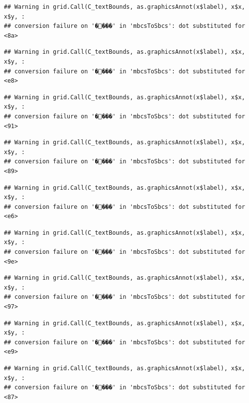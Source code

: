 \documentclass[
]{article}
\begin{document}
\begin{verbatim}
## Warning in grid.Call(C_textBounds, as.graphicsAnnot(x$label), x$x, x$y, :
## conversion failure on '����' in 'mbcsToSbcs': dot substituted for <8a>
\end{verbatim}

\begin{verbatim}
## Warning in grid.Call(C_textBounds, as.graphicsAnnot(x$label), x$x, x$y, :
## conversion failure on '����' in 'mbcsToSbcs': dot substituted for <e8>
\end{verbatim}

\begin{verbatim}
## Warning in grid.Call(C_textBounds, as.graphicsAnnot(x$label), x$x, x$y, :
## conversion failure on '����' in 'mbcsToSbcs': dot substituted for <91>
\end{verbatim}

\begin{verbatim}
## Warning in grid.Call(C_textBounds, as.graphicsAnnot(x$label), x$x, x$y, :
## conversion failure on '����' in 'mbcsToSbcs': dot substituted for <89>
\end{verbatim}

\begin{verbatim}
## Warning in grid.Call(C_textBounds, as.graphicsAnnot(x$label), x$x, x$y, :
## conversion failure on '����' in 'mbcsToSbcs': dot substituted for <e6>
\end{verbatim}

\begin{verbatim}
## Warning in grid.Call(C_textBounds, as.graphicsAnnot(x$label), x$x, x$y, :
## conversion failure on '����' in 'mbcsToSbcs': dot substituted for <9e>
\end{verbatim}

\begin{verbatim}
## Warning in grid.Call(C_textBounds, as.graphicsAnnot(x$label), x$x, x$y, :
## conversion failure on '����' in 'mbcsToSbcs': dot substituted for <97>
\end{verbatim}

\begin{verbatim}
## Warning in grid.Call(C_textBounds, as.graphicsAnnot(x$label), x$x, x$y, :
## conversion failure on '����' in 'mbcsToSbcs': dot substituted for <e9>
\end{verbatim}

\begin{verbatim}
## Warning in grid.Call(C_textBounds, as.graphicsAnnot(x$label), x$x, x$y, :
## conversion failure on '����' in 'mbcsToSbcs': dot substituted for <87>
\end{verbatim}
\end{document}
